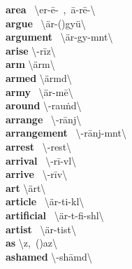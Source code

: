 \documentclass[10pt,a4paper]{article}
\begin{document}
\begin{multicols}{2}
\textbf{ area }\quad \ \textbackslash \textprimstress er-\={e}-\textschwa \ ,\ \textprimstress \={a}-r\={e}-\textschwa \textbackslash \\
\textbf{ argue }\quad \ \textbackslash \textprimstress \"{a}r-(\textsecstress )gy\"{u}\textbackslash \\
\textbf{ argument }\quad \ \textbackslash \textprimstress \"{a}r-gy\textschwa -m\textschwa nt\textbackslash \\
\textbf{ arise }\quad \textbackslash \textschwa -\textprimstress r\={i}z\textbackslash \\
\textbf{ arm }\quad \textbackslash \textprimstress \"{a}rm\textbackslash \\
\textbf{ armed }\quad \textbackslash \textprimstress \"{a}rmd\textbackslash \\
\textbf{ army }\quad \ \textbackslash \textprimstress \"{a}r-m\={e}\textbackslash \\
\textbf{ around }\quad \textbackslash \textschwa -\textprimstress rau\. nd\textbackslash \\
\textbf{ arrange }\quad \ \textbackslash \textschwa -\textprimstress r\={a}nj\textbackslash \\
\textbf{ arrangement }\quad \ \textbackslash \textschwa -\textprimstress r\={a}nj-m\textschwa nt\textbackslash \\
\textbf{ arrest }\quad \ \textbackslash \textschwa -\textprimstress rest\textbackslash \\
\textbf{ arrival }\quad \ \textbackslash \textschwa -\textprimstress r\={i}-v\textschwa l\textbackslash \\
\textbf{ arrive }\quad \ \textbackslash \textschwa -\textprimstress r\={i}v\textbackslash \\
\textbf{ art }\quad \textbackslash \textprimstress \"{a}rt\textbackslash \\
\textbf{ article }\quad \ \textbackslash \textprimstress \"{a}r-ti-k\textschwa l\textbackslash \\
\textbf{ artificial }\quad \ \textbackslash \textsecstress \"{a}r-t\textschwa -\textprimstress fi-sh\textsuperscript{\textreve}l\textbackslash \\
\textbf{ artist }\quad \ \textbackslash \textprimstress \"{a}r-tist\textbackslash \\
\textbf{ as }\quad \textbackslash \textschwa z,\ (\textsecstress )az\textbackslash \\
\textbf{ ashamed }\quad \textbackslash \textschwa -\textprimstress sh\={a}md\textbackslash \\

\end{multicols}
\end{document}
